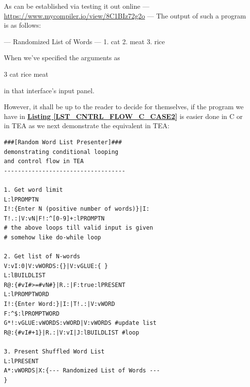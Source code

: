 \documentclass[a4paper, 18pt]{book} %
\begin{document}
{{{\begin{appendices}
As can be established via testing it out online --- \url{https://www.mycompiler.io/view/8C1BIz72g2o} --- The output of such a program is as follows:


  \vspace{1em}
  
 \begin{tcbverbatim}
--- Randomized List of Words ---
1. cat
2. meat
3. rice
  \end{tcbverbatim}
    
When we've specified the arguments as 

 \begin{tcbverbatim}
3
cat
rice
meat
  \end{tcbverbatim}
  
 in that interface's input panel. 

\vspace{2em}

However, it shall be up to the reader to decide for themselves, if the program we have in \textbf{\hyperref[LST_CNTRL_FLOW_C_CASE2]{Listing \ref{LST_CNTRL_FLOW_C_CASE2}}} is easier done in C or in TEA as we next demonstrate the equivalent in TEA:



\vspace{2em}

  \begin{tcolorbox}[teaterminalstyle, title=Conditional Looping in TEA: Random Word List Presenter, breakable]
  \begin{lstlisting}[language=TEA,breaklines=true,]
###[Random Word List Presenter]###
demonstrating conditional looping
and control flow in TEA
-----------------------------------

1. Get word limit
L:lPROMPTN
I!:{Enter N (positive number of words)}|I:
T!.:|V:vN|F!:^[0-9]+:lPROMPTN
# the above loops till valid input is given
# somehow like do-while loop

2. Get list of N-words
V:vI:0|V:vWORDS:{}|V:vGLUE:{ }
L:lBUILDLIST 
R@:{#vI#>=#vN#}|R.:|F:true:lPRESENT
L:lPROMPTWORD
I!:{Enter Word:}|I:|T!.:|V:vWORD
F:^$:lPROMPTWORD
G*!:vGLUE:vWORDS:vWORD|V:vWORDS #update list
R@:{#vI#+1}|R.:|V:vI|J:lBUILDLIST #loop

3. Present Shuffled Word List
L:lPRESENT
A*:vWORDS|X:{--- Randomized List of Words ---
}
   \end{lstlisting}
  \end{tcolorbox}

\vspace{2em}



\end{appendices}}}}
\end{document}
